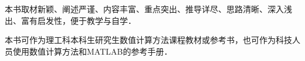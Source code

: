  \vspace*{0.0cm}
\thispagestyle{empty}
\vspace*{2.2cm}
\centerline{\huge\hei{\color{mblue}{内~容~简~介}}}\vspace{2cm}

本书取材新颖、阐述严谨、内容丰富、重点突出、推导详尽、思路清晰、深入浅出、富有启发性，便于教学与自学．

本书可作为理工科本科生研究生数值计算方法课程教材或参考书，也可作为科技人员使用数值计算方法和MATLAB的参考手册．
